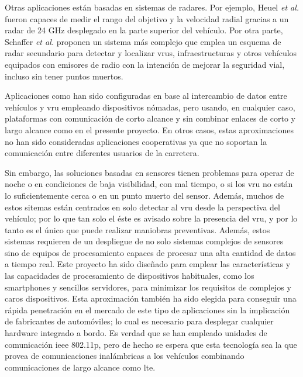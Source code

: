 Otras aplicaciones están basadas en sistemas de radares. Por ejemplo, Heuel \emph{et al.} \cite{8} fueron capaces de medir el rango del objetivo y la velocidad radial gracias a un radar de 24 GHz desplegado en la parte superior del vehículo. Por otra parte, Schaffer \emph{et al.} \cite{9} proponen un sistema más complejo que emplea un esquema de radar secundario para detectar y localizar \gls{vru}s, infraestructuras y otros vehículos equipados con emisores de radio con la intención de mejorar la seguridad vial, incluso sin tener puntos muertos.

Aplicaciones como \cite{10-12} han sido configuradas en base al intercambio de datos entre vehículos y \gls{vru} empleando dispositivos nómadas, pero usando, en cualquier caso, plataformas con comunicación de corto alcance y sin combinar enlaces de corto y largo alcance como en el presente proyecto. En otros casos, estas aproximaciones no han sido consideradas aplicaciones cooperativas ya que no soportan la comunicación entre diferentes usuarios de la carretera.

Sin embargo, las soluciones basadas en sensores tienen problemas para operar de noche o en condiciones de baja visibilidad, con mal tiempo, o si los \gls{vru} no están lo suficientemente cerca o en un punto muerto del sensor. Además, muchos de estos sitemas están centrados en solo detectar al \gls{vru} desde la perspectiva del vehículo; por lo que tan solo el éste es avisado sobre la presencia del
\gls{vru}, y por lo tanto es el único que puede realizar maniobras preventivas. Además, estos sistemas requieren de un despliegue de no solo sistemas complejos de sensores sino de equipos de procesamiento capaces de procesar una alta cantidad de datos a tiempo real. Este proyecto ha sido diseñado para emplear las características y las capacidades de procesamiento de dispositivos habituales, como los smartphones y sencillos servidores, para minimizar los requisitos de complejos y caros dispositivos. Esta aproximación también ha sido elegida para conseguir una rápida penetración en el mercado de este tipo de aplicaciones sin la implicación de fabricantes de automóviles; lo cual es necesario para desplegar cualquier hardware integrado a bordo. Es verdad que se han empleado unidades de comunicación \gls{ieee} 802.11p, pero de hecho se espera que esta tecnología sea la que provea de comunicaciones inalámbricas a los vehículos combinando comunicaciones de largo alcance como \gls{lte}\cite{13}.